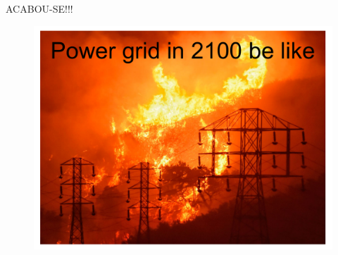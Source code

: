 \documentclass{beamer}
\begin{document}
\begin{frame}
\begin{center}
    \Huge ACABOU-SE!!!
\end{center}
\begin{figure}
    \centering
    \includegraphics[width=0.7\linewidth]{power-grid-2100-be-like.pdf}
\end{figure}
\end{frame}
\end{document}
